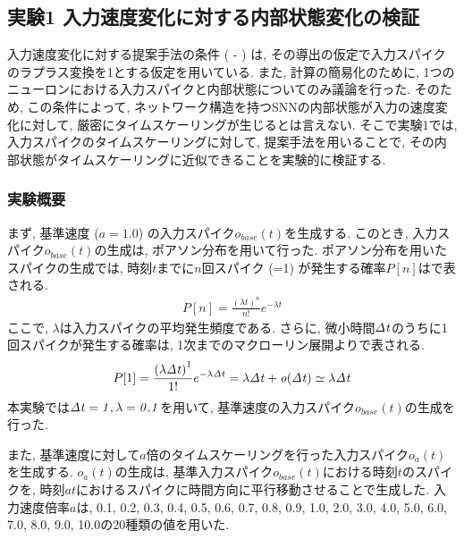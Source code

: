 \subsection{実験1 入力速度変化に対する内部状態変化の検証}

入力速度変化に対する提案手法の条件 ( - ) は, その導出の仮定で入力スパイクのラプラス変換を1とする仮定を用いている.
また, 計算の簡易化のために, 1つのニューロンにおける入力スパイクと内部状態についてのみ議論を行った.
そのため, この条件によって, ネットワーク構造を持つSNNの内部状態が入力の速度変化に対して, 厳密にタイムスケーリングが生じるとは言えない.
そこで実験1では, 入力スパイクのタイムスケーリングに対して, 提案手法を用いることで, その内部状態がタイムスケーリングに近似できることを実験的に検証する.


\subsubsection{実験概要}
まず, 基準速度 ($a=1.0$) の入力スパイク$o_{base}(t)$を生成する.
このとき, 入力スパイク$o_{base}(t)$の生成は, ポアソン分布を用いて行った.
ポアソン分布を用いたスパイクの生成\cite{poisson}では, 時刻$t$までに$n$回スパイク (=1) が発生する確率$P[n]$はで表される.
\begin{align}
    P[n] = \frac{\left(\lambda t\right)^n}{n!} e^{-\lambda t} \label{eq:poisson:distribution}
\end{align}
ここで, $\lambda$は入力スパイクの平均発生頻度である.
さらに, 微小時間$\it{\Delta} t$のうちに1回スパイクが発生する確率は, 1次までのマクローリン展開よりで表される.
\begin{align}
    P[1] = \frac{\left(\lambda \it{\Delta} t\right)^1}{1!} e^{-\lambda \it{\Delta} t} = \lambda \it{\Delta} t + o(\it{\Delta} t) \simeq \lambda \it{\Delta} t \label{eq:poisson:distribution:approximation}
\end{align}
本実験では$\it{\Delta} t = 1, \lambda=0.1$を用いて, 基準速度の入力スパイク$o_{base}(t)$の生成を行った.

また, 基準速度に対して$a$倍のタイムスケーリングを行った入力スパイク$o_a(t)$を生成する.
$o_a(t)$の生成は, 基準入力スパイク$o_{base}(t)$における時刻$t$のスパイクを, 時刻$at$におけるスパイクに時間方向に平行移動させることで生成した.
入力速度倍率$a$は, 0.1, 0.2, 0.3, 0.4, 0.5, 0.6, 0.7, 0.8, 0.9, 1.0, 2.0, 3.0, 4.0, 5.0, 6.0, 7.0, 8.0, 9.0, 10.0の20種類の値を用いた.


